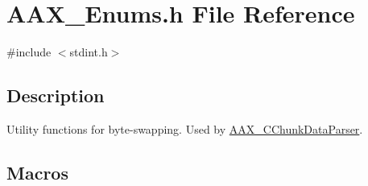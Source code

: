 \hypertarget{a00491}{}\section{A\+A\+X\+\_\+\+Enums.\+h File Reference}
\label{a00491}
{\ttfamily \#include $<$stdint.\+h$>$}\newline


\subsection{Description}
Utility functions for byte-\/swapping. Used by \mbox{\hyperlink{a01461}{A\+A\+X\+\_\+\+C\+Chunk\+Data\+Parser}}. 

\subsection*{Macros}
